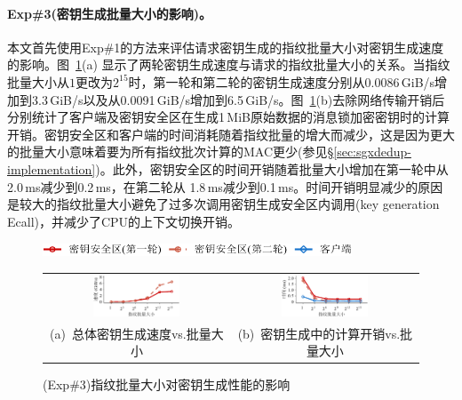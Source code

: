 \paragraph*{Exp\#3(密钥生成批量大小的影响)。}

本文首先使用Exp\#1的方法来评估请求密钥生成的指纹批量大小对密钥生成速度的影响。图~\ref{fig:sgxdedup-exp-keygen-breakdown}(a) 显示了两轮密钥生成速度与请求的指纹批量大小的关系。当指纹批量大小从$1$更改为$2^{15}$时，第一轮和第二轮的密钥生成速度分别从0.0086\,GiB/s增加到3.3\,GiB/s以及从0.0091\,GiB/s增加到6.5\,GiB/s。图~\ref{fig:sgxdedup-exp-keygen-breakdown}(b)去除网络传输开销后分别统计了客户端及密钥安全区在生成1\,MiB原始数据的消息锁加密密钥时的计算开销。密钥安全区和客户端的时间消耗随着指纹批量的增大而减少，这是因为更大的批量大小意味着要为所有指纹批次计算的MAC更少(参见\S\ref{sec:sgxdedup-implementation})。此外，密钥安全区的时间开销随着批量大小增加在第一轮中从2.0\,ms减少到0.2\,ms，在第二轮从 1.8\,ms减少到0.1\,ms。时间开销明显减少的原因是较大的指纹批量大小避免了过多次调用密钥生成安全区内调用(key generation Ecall)，并减少了CPU的上下文切换开销。

\begin{figure}[!htb]
    \centering
    \includegraphics[height=11pt]{pic/sgxdedup/plot/exp_a2/expa2_keyEnclaveBatchSize_legend.pdf}
    \begin{tabular}{@{\ }c@{\ }c}
        \includegraphics[width=0.49\textwidth]{pic/sgxdedup/plot/exp_a2/expa2_keyEnclaveBatchSize_Performance_overall.pdf} & 
        \includegraphics[width=0.49\textwidth]{pic/sgxdedup/plot/exp_a2/expa2_keyEnclaveBatchSize_Performance_1st.pdf}           \hspace{5pt} \\
        \mbox{\small (a) 总体密钥生成速度vs.批量大小}                                                                      & 
        \mbox{\small (b) 密钥生成中的计算开销vs.批量大小}
    \end{tabular}
    \caption{(Exp\#3)指纹批量大小对密钥生成性能的影响}
    \label{fig:sgxdedup-exp-keygen-breakdown}
\end{figure}


